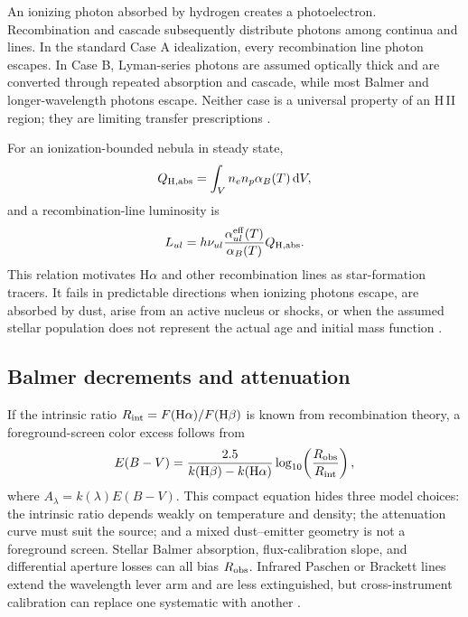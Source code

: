 An ionizing photon absorbed by hydrogen creates a photoelectron.  Recombination and
cascade subsequently distribute photons among continua and lines.  In the standard
Case A idealization, every recombination line photon escapes.  In Case B, Lyman-series
photons are assumed optically thick and are converted through repeated absorption and
cascade, while most Balmer and longer-wavelength photons escape.  Neither case is a
universal property of an H\,II region; they are limiting transfer prescriptions
\citep{OsterbrockFerland2006}.

For an ionization-bounded nebula in steady state,
\begin{equation}
 Q_{\rm H,abs}=\int_V n_en_p\alpha_B(T)\,\mathrm{d}V,
 \label{eq:stromgren-balance}
\end{equation}
and a recombination-line luminosity is
\begin{equation}
 L_{ul}=h\nu_{ul}\frac{\alpha^{\rm eff}_{ul}(T)}{\alpha_B(T)}
 Q_{\rm H,abs}.
 \label{eq:recombination-luminosity-qh}
\end{equation}
This relation motivates H$\alpha$ and other recombination lines as star-formation
tracers.  It fails in predictable directions when ionizing photons escape, are
absorbed by dust, arise from an active nucleus or shocks, or when the assumed stellar
population does not represent the actual age and initial mass function
\citep{KennicuttEvans2012}.

\subsection{Balmer decrements and attenuation}

If the intrinsic ratio $R_{\rm int}=F({\rm H}\alpha)/F({\rm H}\beta)$ is known from
recombination theory, a foreground-screen color excess follows from
\begin{equation}
 E(B-V)=\frac{2.5}{k({\rm H}\beta)-k({\rm H}\alpha)}
 \log_{10}\!\left(\frac{R_{\rm obs}}{R_{\rm int}}\right),
 \label{eq:balmer-decrement-ebv}
\end{equation}
where $A_\lambda=k(\lambda)E(B-V)$.  This compact equation hides three model choices:
the intrinsic ratio depends weakly on temperature and density; the attenuation curve
must suit the source; and a mixed dust--emitter geometry is not a foreground screen.
Stellar Balmer absorption, flux-calibration slope, and differential aperture losses
can all bias $R_{\rm obs}$.  Infrared Paschen or Brackett lines extend the wavelength
lever arm and are less extinguished, but cross-instrument calibration can replace one
systematic with another \citep{Fitzpatrick1999}.

